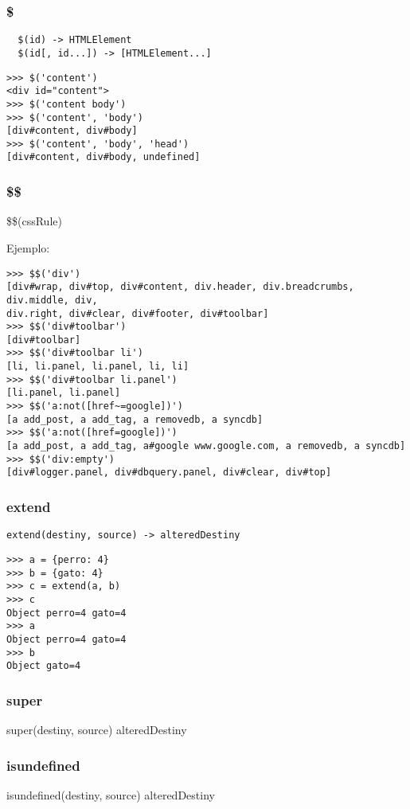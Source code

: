 \subsubsection*{\$}
\begin{verbatim}
  $(id) -> HTMLElement
  $(id[, id...]) -> [HTMLElement...]
\end{verbatim} 

\begin{lstlisting}[style=consola]
>>> $('content')
<div id="content">
>>> $('content body')
>>> $('content', 'body')
[div#content, div#body]
>>> $('content', 'body', 'head')
[div#content, div#body, undefined]
\end{lstlisting}

\subsubsection*{\$\$}
\$\$(cssRule) \rightarrow [HTMLElement...]

\noindent
Ejemplo:
\begin{lstlisting}[style=consola]
>>> $$('div')
[div#wrap, div#top, div#content, div.header, div.breadcrumbs, div.middle, div,
div.right, div#clear, div#footer, div#toolbar]
>>> $$('div#toolbar')
[div#toolbar]
>>> $$('div#toolbar li')
[li, li.panel, li.panel, li, li]
>>> $$('div#toolbar li.panel')
[li.panel, li.panel]
>>> $$('a:not([href~=google])')
[a add_post, a add_tag, a removedb, a syncdb]
>>> $$('a:not([href=google])')
[a add_post, a add_tag, a#google www.google.com, a removedb, a syncdb]
>>> $$('div:empty')
[div#logger.panel, div#dbquery.panel, div#clear, div#top]
\end{lstlisting}

\subsubsection*{extend}
\verb|extend(destiny, source) -> alteredDestiny|

\begin{lstlisting}[style=consola]
>>> a = {perro: 4}
>>> b = {gato: 4}
>>> c = extend(a, b)
>>> c
Object perro=4 gato=4
>>> a
Object perro=4 gato=4
>>> b
Object gato=4
\end{lstlisting}

\subsubsection*{super}
super(destiny, source) \rightarrow alteredDestiny
\subsubsection*{isundefined}
isundefined(destiny, source) \rightarrow alteredDestiny
